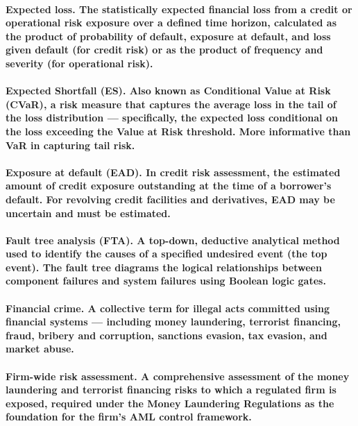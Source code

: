 \paragraph{\textbf{Expected loss}. The statistically expected financial loss from a credit or operational risk exposure over a defined time horizon, calculated as the product of probability of default, exposure at default, and loss given default (for credit risk) or as the product of frequency and severity (for operational risk).}

\paragraph{\textbf{Expected Shortfall (ES)}. Also known as Conditional Value at Risk (CVaR), a risk measure that captures the average loss in the tail of the loss distribution — specifically, the expected loss conditional on the loss exceeding the Value at Risk threshold. More informative than VaR in capturing tail risk.}

\paragraph{\textbf{Exposure at default (EAD)}. In credit risk assessment, the estimated amount of credit exposure outstanding at the time of a borrower's default. For revolving credit facilities and derivatives, EAD may be uncertain and must be estimated.}

\paragraph{\textbf{Fault tree analysis (FTA)}. A top-down, deductive analytical method used to identify the causes of a specified undesired event (the top event). The fault tree diagrams the logical relationships between component failures and system failures using Boolean logic gates.}

\paragraph{\textbf{Financial crime}. A collective term for illegal acts committed using financial systems — including money laundering, terrorist financing, fraud, bribery and corruption, sanctions evasion, tax evasion, and market abuse.}

\paragraph{\textbf{Firm-wide risk assessment}. A comprehensive assessment of the money laundering and terrorist financing risks to which a regulated firm is exposed, required under the Money Laundering Regulations as the foundation for the firm's AML control framework.}

